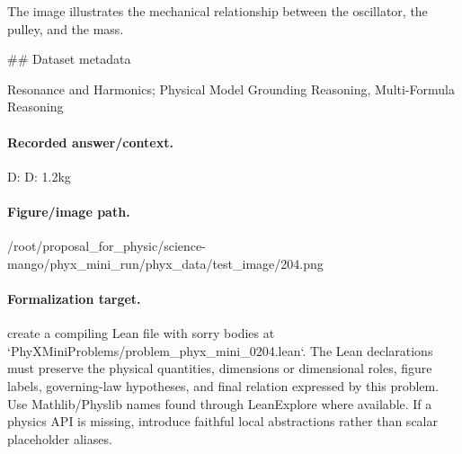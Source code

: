 The image illustrates the mechanical relationship between the oscillator, the pulley, and the mass.

\#\# Dataset metadata

Resonance and Harmonics; Physical Model Grounding Reasoning, Multi-Formula Reasoning

\paragraph{Recorded answer/context.}
D: D: 1.2kg

\paragraph{Figure/image path.}
/root/proposal\_for\_physic/science-mango/phyx\_mini\_run/phyx\_data/test\_image/204.png

\paragraph{Formalization target.}
create a compiling Lean file with sorry bodies at `PhyXMiniProblems/problem\_phyx\_mini\_0204.lean`. The Lean declarations must preserve the physical quantities, dimensions or dimensional roles, figure labels, governing-law hypotheses, and final relation expressed by this problem.
Use Mathlib/Physlib names found through LeanExplore where available. If a physics API is missing, introduce faithful local abstractions rather than scalar placeholder aliases.


